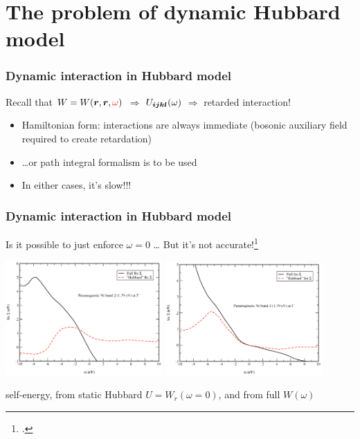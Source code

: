 \documentclass{beamer}
\begin{document}
\section{The problem of dynamic Hubbard model}

\begin{frame}
\frametitle{Dynamic interaction in Hubbard model}

Recall that $W = W(\vb*{r}, \vb*{r}, \textcolor{red}{\omega} )$
$\Rightarrow$ 
$U_{\vb*{i} \vb*{j} \vb*{k} \vb*{l}}(\omega)$
$\Rightarrow$
retarded interaction! 

\begin{itemize}
    \item Hamiltonian form: interactions are always immediate 
    (bosonic auxiliary field required to create retardation)
    \item \dots or path integral formalism is to be used 
    \item In either cases, it's slow!!! 
\end{itemize}

\end{frame}

\begin{frame}
\frametitle{Dynamic interaction in Hubbard model}

Is it possible to just enforce $\omega = 0$ \dots
But it's not accurate!\footcite{aryasetiawan2004frequency}

\begin{center}
    \includegraphics[width=0.45\textwidth]{plots/ni-re-sigma-1.PNG}
    \includegraphics[width=0.45\textwidth]{plots/ni-im-sigma-1.PNG}
\end{center}

 self-energy, from static Hubbard $U = W_r(\omega = 0)$,
and from full $W(\omega)$ 

\end{frame}
\end{document}
